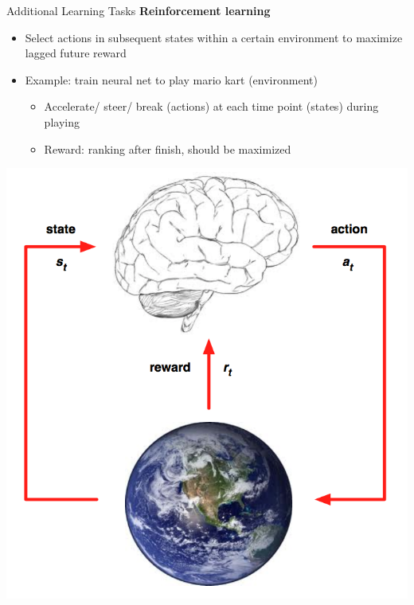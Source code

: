 \documentclass[11pt,compress,t,notes=noshow, xcolor=table]{beamer}
\begin{document}
\begin{vbframe}{Additional Learning Tasks}
\textbf{Reinforcement learning}

\begin{itemize}

  \item Select actions in subsequent  states within a certain environment to 
  maximize lagged future reward
  
  \item Example: train neural net to play mario kart (environment)
  
  \begin{itemize}
  
    \item Accelerate/ steer/ break (actions) at each time point (states) during 
    playing
    
    \item Reward: ranking after finish, should be maximized
  
  \end{itemize}

\end{itemize}

\begin{center}
  \includegraphics[height=0.45\textheight,keepaspectratio]{figure_man/state_action_reward_diagram.png}
\end{center}

\end{vbframe}
\end{document}
